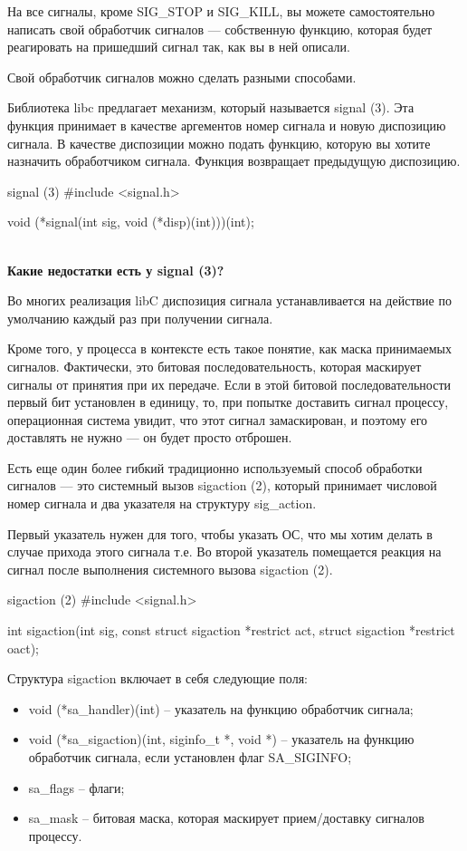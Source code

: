 На все сигналы, кроме SIG\_STOP и SIG\_KILL, вы можете самостоятельно написать свой обработчик сигналов --- собственную функцию, которая будет реагировать на пришедший сигнал так, как вы в ней описали.

Свой обработчик сигналов можно сделать разными способами.

Библиотека libc предлагает механизм, который называется signal (3). Эта функция принимает в качестве аргементов номер сигнала и новую диспозицию сигнала. В качестве диспозиции можно подать функцию, которую вы хотите назначить обработчиком сигнала. Функция возвращает предыдущую диспозицию.

\begin{CCode}{signal (3)}
	#include <signal.h>

    void (*signal(int sig, void (*disp)(int)))(int); \end{CCode}
~\\[0.5cm]

\textbf{Какие недостатки есть у signal (3)?}

Во многих реализация libC диспозиция сигнала устанавливается на действие по умолчанию каждый раз при получении сигнала.

Кроме того, у процесса в контексте есть такое понятие, как маска принимаемых сигналов. Фактически, это битовая последовательность, которая маскирует сигналы от принятия при их передаче. Если в этой битовой последовательности первый бит установлен в единицу, то, при попытке доставить сигнал процессу, операционная система увидит, что этот сигнал замаскирован, и поэтому его доставлять не нужно --- он будет просто отброшен.

Есть еще один более гибкий традиционно используемый способ обработки сигналов --- это системный вызов sigaction (2), который принимает числовой номер сигнала и два указателя на структуру sig\_action.

Первый указатель нужен для того, чтобы указать ОС, что мы хотим делать в случае прихода этого сигнала т.е. Во второй указатель помещается реакция на сигнал после выполнения системного вызова sigaction (2).

\begin{CCode}{sigaction (2)}
	#include <signal.h>

     int sigaction(int sig, const struct sigaction *restrict act,
         struct sigaction *restrict oact);  \end{CCode}

Структура sigaction включает в себя следующие поля:

\begin{itemize}
	\item void (*sa\_handler)(int) -- указатель на функцию обработчик сигнала;
	\item void (*sa\_sigaction)(int, siginfo\_t *, void *) -- указатель на функцию обработчик сигнала, если установлен флаг SA\_SIGINFO;
	\item sa\_flags -- флаги;
	\item sa\_mask -- битовая маска, которая маскирует прием/доставку сигналов процессу.
\end{itemize}
